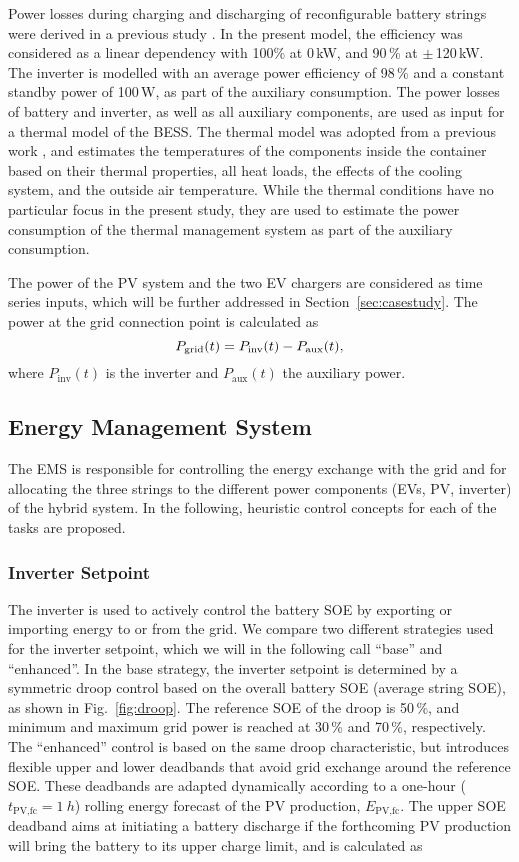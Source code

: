 \documentclass[final,5p,times,twocolumn]{elsarticle}
\begin{document}
Power losses during charging and discharging of reconfigurable battery strings were derived in a previous study \cite{Engelhardt.2021}. In the present model, the efficiency was considered as a linear dependency with 100\% at 0\,kW, and 90\,\% at $\pm$\,120\,kW. The inverter is modelled with an average power efficiency of 98\,\% and a constant standby power of 100\,W, as part of the auxiliary consumption. The power losses of battery and inverter, as well as all auxiliary components, are used as input for a thermal model of the BESS. The thermal model was adopted from a previous work \cite{JesperGejlLage.2021}, and estimates the temperatures of the components inside the container based on their thermal properties, all heat loads, the effects of the cooling system, and the outside air temperature. While the thermal conditions have no particular focus in the present study, they are used to estimate the power consumption of the thermal management system as part of the auxiliary consumption.

The power of the PV system and the two EV chargers are considered as time series inputs, which will be further addressed in Section~\ref{sec:casestudy}. The power at the grid connection point is calculated as 
\begin{equation}\label{eq:grid_contraints}
\small
    P_{\text{grid}}(t) = P_{\text{inv}}(t) - P_{\text{aux}}(t),
\end{equation}
where $P_{\text{inv}}(t)$ is the inverter and $P_{\text{aux}}(t)$ the auxiliary power.

\subsection{Energy Management System}
The EMS is responsible for controlling the energy exchange with the grid and for allocating the three strings to the different power components (EVs, PV, inverter) of the hybrid system. In the following, heuristic control concepts for each of the tasks are proposed.

\subsubsection{Inverter Setpoint}
The inverter is used to actively control the battery SOE by exporting or importing energy to or from the grid. We compare two different strategies used for the inverter setpoint, which we will in the following call ``base'' and ``enhanced''. In the base strategy, the inverter setpoint is determined by a symmetric droop control based on the overall battery SOE (average string SOE), as shown in Fig.~\ref{fig:droop}. The reference SOE of the droop is 50\,\%, and minimum and maximum grid power is reached at 30\,\% and 70\,\%, respectively. The ``enhanced'' control is based on the same droop characteristic, but introduces flexible upper and lower deadbands that avoid grid exchange around the reference SOE. These deadbands are adapted dynamically according to a one-hour ($t_{\text{PV,fc}} = \SI{1}{h}$) rolling energy forecast of the PV production, $E_{\text{PV,fc}}$. The upper SOE deadband aims at initiating a battery discharge if the forthcoming PV production will bring the battery to its upper charge limit, and is calculated as
\end{document}
